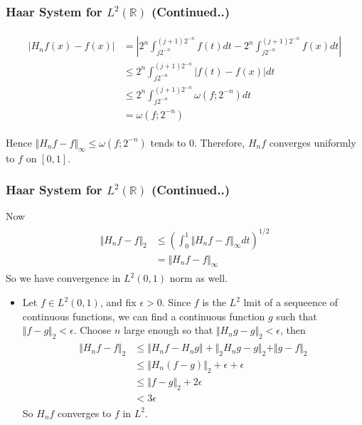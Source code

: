 \documentclass{beamer}
\begin{document}
\begin{frame}
    \frametitle{ Haar System for  $L^2\left({\mathbb{R}}\right)$ (Continued..)}
    \begin{eqnarray*}
        \begin{split}
            |H_nf(x) - f(x)| &= |2^n\int_{j2^{-n}}^{(j+1)2^{-n}}f(t)dt-2^n\int_{j2^{-n}}^{(j+1)2^{-n}}f(x)dt| \\
            &\le 2^n \int_{j2^{-n}}^{(j+1)2^{-n}}|f(t) - f(x)|dt \\
            &\le 2^n \int_{j2^{-n}}^{(j+1)2^{-n}}\omega(f;2^{-n})dt \\
            &= \omega(f;2^{-n})
        \end{split}
    \end{eqnarray*}

    Hence $\Vert H_nf - f \Vert_{\infty} \le \omega(f;2^{-n})$ tends to 0. Therefore, $H_nf$ converges uniformly to $f$ on $[0, 1]$.
\end{frame}


\begin{frame}
    \frametitle{Haar System for  $L^2\left({\mathbb{R}}\right)$ (Continued..)}
    Now
    \begin{eqnarray*}
        \begin{split}
            \Vert H_nf - f \Vert_{2} &\le \left(\int_0^1 \Vert H_nf - f \Vert_{\infty}dt \right)^{1/2}\\
            &= \Vert H_nf - f \Vert_{\infty}
        \end{split}
    \end{eqnarray*}
So we have convergence in $L^2(0,1)$ norm as well.
\begin{itemize}
    \item Let  $f \in L^2(0,1)$, and fix $ \epsilon > 0$. Since $f$ is the $L^2$ lmit of a sequeence of 
    continuous functions, we can find a continuous function $g$ such that $\Vert f - g \Vert_2 < \epsilon$. Choose $n$ large enough so that
    $\Vert H_ng - g \Vert_2 < \epsilon$, then
    \begin{eqnarray*}
        \begin{split}
            \Vert H_nf - f \Vert_{2} &\le \Vert H_nf - H_ng \Vert + \Vert_2 H_ng- g \Vert_2  + \Vert g -f \Vert_2 \\
            &\le \Vert H_n(f- g)\Vert_2 + \epsilon + \epsilon \\
            &\le \Vert f- g\Vert_2 +  2\epsilon \\
            &< 3\epsilon
        \end{split}
    \end{eqnarray*}
    So $H_nf$ converges to $f$  in $L^2$.
\end{itemize}
\end{frame}
    
\end{document}

